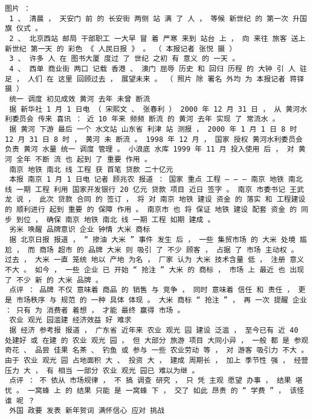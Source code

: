 \documentclass{article}
\begin{document}
\begin{Verbatim}[commandchars=\\\{\}]
 图片 ： 
 1 、 清晨 ， 天安门 前 的 长安街 两侧 站 满 了 人 ， 等候 新世纪 的 第一次 升国旗 仪式 。 
 2 、 北京西站 邮局 干部职工 一大早 冒 着 严寒 来到 站台 上 ， 向 来往 旅客 送上 新世纪 第一天 的 彩色 《 人民日报 》 。 （ 本报记者 张悦 摄 ） 
 3 、 许多 人 在 图书大厦 度过 了 世纪 之初 有 意义 的 一天 。 
 4 、 西单 商业街 两口 记载 香港 、 澳门 屈辱 历史 和 回归 历程 的 大钟 引 人 驻足 ， 人们 在 这里 回顾过去 ， 展望未来 。 （ 照片 除 署名 外均 为 本报记者 蒋铎 摄 ） 
 统一 调度 初见成效 黄河 去年 未曾 断流 
 据 新华社 1 月 1 日电 （ 宋熙文 、 张春利 ） 2000 年 12 月 31 日 ， 从 黄河水利委员会 传来 喜讯 ： 近 10 年来 频频 断流 的 黄河 去年 实现 了 常流水 。 
 据 黄河 下游 最后 一个 水文站 山东省 利津 站 测报 ， 2000 年 1 月 1 日 8 时 12 月 31 日 8 时 ， 黄河 未 断流 。 1998 年 12 月 ， 国家 授权 黄河水利委员会 负责 黄河 水量 统一 调度 管理 。 小浪底 水库 1999 年 11 月 投入使用 后 ， 对 黄河 全年 不断 流 也 起到 了 重要 作用 。 
 南京 地铁 南北 线 工程 获 首笔 贷款 二十亿元 
 本报 南京 1 月 1 日电 记者 顾兆农 报道 ： 国家 重点 工程 — — — 南京 地铁 南北 线 一期 工程 利用 国家开发银行 20 亿元 贷款 项目 近日 签字 。 南京 市委书记 王武龙 说 ， 此次 贷款 合同 的 签订 ， 将 对 南京 地铁 建设 资金 的 落实 和 工程建设 的 顺利进行 起到 重要 的 保障 作用 。 南京市 也 将 保证 地铁 建设 配套 资金 的 同步 到位 ， 确保 南京 地铁 南北 线 一期 工程 如期 建成 。 
 劣米 唤醒 品牌意识 企业 钟情 大米 商标 
 据 北京日报 报道 ， “ 掺油 大米 ” 事件 发生 后 ， 一些 集贸市场 的 大米 处境 尴尬 ， 而 商场 超市 的 品牌 大米 则 吸引 了 不少 顾客 ， 占据 了 市场 主动权 。 过去 ， 大米 一直 笼统 地以 产地 为名 ， 厂家 认为 大米 技术含量 低 ， 注册 意义 不大 。 如今 ， 一些 企业 已 开始 “ 抢注 ” 大米 的 商标 ， 市场 上 最近 也 出现 了 不少 新 的 大米 品牌 。 
 点评 ： 品牌 不仅 意味着 商品 的 销售 与 竞争 ， 同时 意味着 信任 和 责任 ， 更是 市场秩序 与 规范 的 一种 具体 体现 。 大米 商标 “ 抢注 ” ， 再 一次 提醒 企业 ： 只有 为 消费者 着想 ， 才能 最终 赢得 市场 。 
 农业 观光 园滥建 经济效益 好 难求 
 据 经济 参考报 报道 ， 广东省 近年来 农业 观光 园 建设 泛滥 ， 至今已有 近 40 处建好 或 在建 的 农业 观光 园 ， 但 大部分 旅游 项目 大同小异 ， 一般 都 是 参观 奇花 、 品尝 佳果 名茶 、 钓鱼 或 参与 一些 农业劳动 等 ， 对 游客 吸引力 不大 。 由于 农业 观光 园 占地面积 大 、 投资 大 ， 建成 周期长 ， 加上 季节性 强 ， 经营 压力 大 ， 有 相当 一部分 农业 观光 园已 难以为继 。 
 点评 ： 不 依从 市场规律 ， 不 搞 调查 研究 ， 只 凭 主观 愿望 办事 ， 结果 堪忧 。 一窝蜂 上 的 结果 只能 是 一窝蜂 下 ， 交了 如此 昂贵 的 “ 学费 ” ， 该怪 谁 呢 ？ 
 外国 政要 发表 新年贺词 满怀信心 应对 挑战 

\end{Verbatim}
\end{document}
